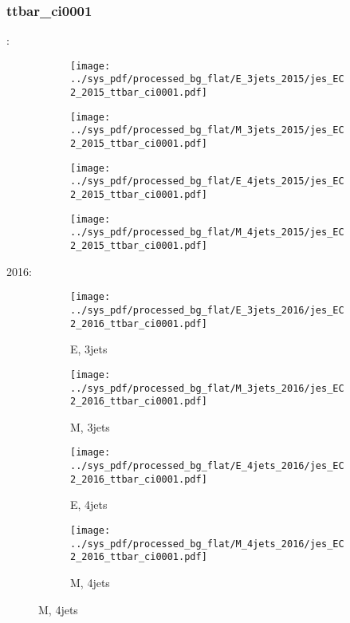 \documentclass{beamer}
\begin{document}
\begin{frame}
\frametitle{ttbar_ci0001}
\fontsize{5}{1}:
\begin{figure}
\centering
\begin{subfigure}[b]{0.24\textwidth}
\texttt{[image: ../sys\_pdf/processed\_bg\_flat/E\_3jets\_2015/jes\_EC2\_2015\_ttbar\_ci0001.pdf]}
\end{subfigure}
\begin{subfigure}[b]{0.24\textwidth}
\texttt{[image: ../sys\_pdf/processed\_bg\_flat/M\_3jets\_2015/jes\_EC2\_2015\_ttbar\_ci0001.pdf]}
\end{subfigure}
\begin{subfigure}[b]{0.24\textwidth}
\texttt{[image: ../sys\_pdf/processed\_bg\_flat/E\_4jets\_2015/jes\_EC2\_2015\_ttbar\_ci0001.pdf]}
\end{subfigure}
\begin{subfigure}[b]{0.24\textwidth}
\texttt{[image: ../sys\_pdf/processed\_bg\_flat/M\_4jets\_2015/jes\_EC2\_2015\_ttbar\_ci0001.pdf]}
\end{subfigure}
\end{figure}
2016:
\begin{figure}
\centering
\begin{subfigure}[b]{0.24\textwidth}
\texttt{[image: ../sys\_pdf/processed\_bg\_flat/E\_3jets\_2016/jes\_EC2\_2016\_ttbar\_ci0001.pdf]}
\captionsetup{font=tiny}
\caption{E, 3jets}
\end{subfigure}
\begin{subfigure}[b]{0.24\textwidth}
\texttt{[image: ../sys\_pdf/processed\_bg\_flat/M\_3jets\_2016/jes\_EC2\_2016\_ttbar\_ci0001.pdf]}
\captionsetup{font=tiny}
\caption{M, 3jets}
\end{subfigure}
\begin{subfigure}[b]{0.24\textwidth}
\texttt{[image: ../sys\_pdf/processed\_bg\_flat/E\_4jets\_2016/jes\_EC2\_2016\_ttbar\_ci0001.pdf]}
\captionsetup{font=tiny}
\caption{E, 4jets}
\end{subfigure}
\begin{subfigure}[b]{0.24\textwidth}
\texttt{[image: ../sys\_pdf/processed\_bg\_flat/M\_4jets\_2016/jes\_EC2\_2016\_ttbar\_ci0001.pdf]}
\captionsetup{font=tiny}
\caption{M, 4jets}
\end{subfigure}
\end{figure}
\end{frame}
\end{document}
